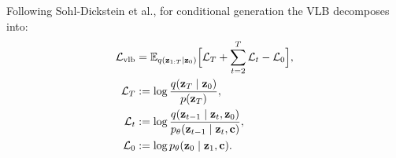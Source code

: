 Following Sohl‐Dickstein et al.\cite{pmlr-v37-sohl-dickstein15}, for conditional generation the VLB decomposes into:
\begin{equation}
\begin{aligned}
\mathcal{L}_{\mathrm{vlb}}
&=
\mathbb{E}_{q(\mathbf{z}_{1:T}\mid\mathbf{z}_0)} \Bigl[
    \mathcal{L}_T
    + \sum_{t=2}^T \mathcal{L}_t
    - \mathcal{L}_0
\Bigr],\\
\mathcal{L}_T
&:= \log\frac{q(\mathbf{z}_T\mid \mathbf{z}_0)}{p(\mathbf{z}_T)},\\
\mathcal{L}_t
&:= \log
\frac{
    q(\mathbf{z}_{t-1} \mid \mathbf{z}_t,\mathbf{z}_0)
}{
    p_\theta(\mathbf{z}_{t-1}\mid \mathbf{z}_t,\mathbf{c})
},\\
\mathcal{L}_0
&:= \log p_\theta(\mathbf{z}_0 \mid \mathbf{z}_1,\mathbf{c}).
\end{aligned}
\end{equation}


